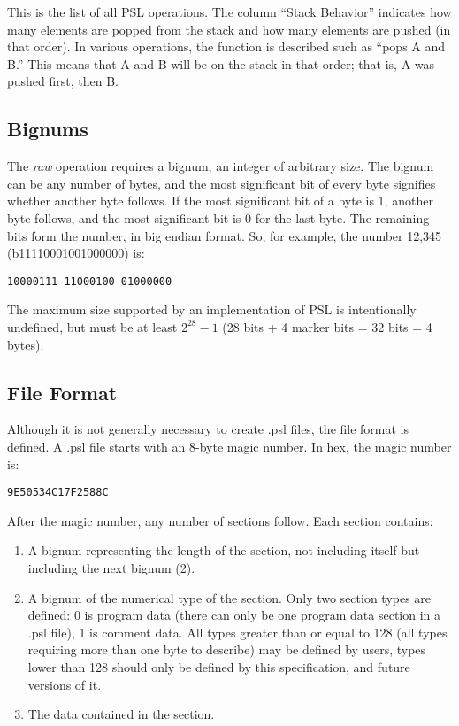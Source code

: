 This is the list of all PSL operations. The column “Stack Behavior” indicates how many elements are popped from the stack and how many elements are pushed (in that order). In various operations, the function is described such as “pops A and B.” This means that A and B will be on the stack in that order; that is, A was pushed first, then B.



\noindent
{}

\subsection{Bignums}

The \textit{raw} operation requires a bignum, an integer of arbitrary size. The bignum can be any number of bytes, and the most significant bit of every byte signifies whether another byte follows. If the most significant bit of a byte is 1, another byte follows, and the most significant bit is 0 for the last byte. The remaining bits form the number, in big endian format. So, for example, the number 12,345 (b11110001001000000) is:

\noindent\texttt{10000111 11000100 01000000}

The maximum size supported by an implementation of PSL is intentionally undefined, but must be at least $2^{28}-1$ (28 bits + 4 marker bits = 32 bits = 4 bytes).



\subsection{File Format}

Although it is not generally necessary to create .psl files, the file format is defined. A .psl file starts with an 8-byte magic number. In hex, the magic number is:

\noindent\texttt{9E50534C17F2588C}

After the magic number, any number of sections follow. Each section contains:

\begin{enumerate}
\item A bignum representing the length of the section, not including itself but including the next bignum (2).
\item A bignum of the numerical type of the section. Only two section types are defined: 0 is program data (there can only be one program data section in a .psl file), 1 is comment data. All types greater than or equal to 128 (all types requiring more than one byte to describe) may be defined by users, types lower than 128 should only be defined by this specification, and future versions of it.
\item The data contained in the section.
\end{enumerate}



